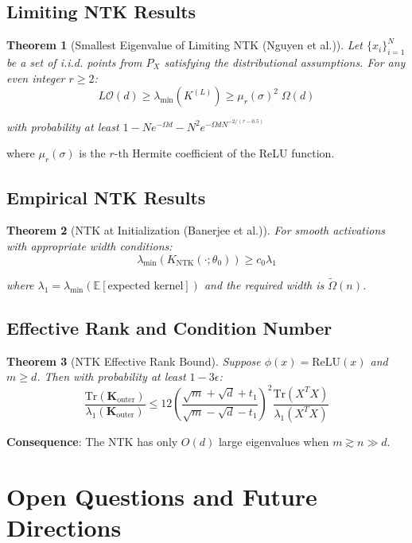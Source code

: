 \documentclass{article}
\newtheorem{theorem}{Theorem}[section]
\newcommand{\E}{\mathbb{E}}
\newcommand{\evmin}[1]{\lambda_{\min}\left(#1\right)}
\newcommand{\bigOmg}{\Omega}
\newcommand{\KNTK}{K_{\text{NTK}}}
\newcommand{\lambdaMin}{\lambda_{\min}}
\newcommand{\Order}{\mathcal{O}}
\newcommand{\TildeOmega}{\tilde{\Omega}}
\begin{document}
\subsection{Limiting NTK Results}

\begin{theorem}[Smallest Eigenvalue of Limiting NTK (Nguyen et al.)]
Let $\{x_i\}_{i=1}^{N}$ be a set of i.i.d. points from $P_X$ satisfying the distributional assumptions. For any even integer $r\ge 2$:
$$L\Order(d) \geq \evmin{K^{(L)}} \geq \mu_r(\sigma)^2\; \bigOmg(d)$$

with probability at least $1 - Ne^{-\bigOmg{d}} - N^2e^{-\bigOmg{dN^{-2/(r-0.5)}}}$
\end{theorem}

where $\mu_r(\sigma)$ is the $r$-th Hermite coefficient of the ReLU function.

\subsection{Empirical NTK Results}

\begin{theorem}[NTK at Initialization (Banerjee et al.)]
For smooth activations with appropriate width conditions:
$$\lambdaMin(\KNTK(\cdot;\theta_0)) \geq c_0 \lambda_1$$

where $\lambda_1 = \lambdaMin(\E[\text{expected kernel}])$ and the required width is $\TildeOmega(n)$.
\end{theorem}

\subsection{Effective Rank and Condition Number}

\begin{theorem}[NTK Effective Rank Bound]
Suppose $\phi(x) = \text{ReLU}(x)$ and $m \geq d$. Then with probability at least $1 - 3\epsilon$:
$$\frac{\text{Tr}(\mathbf{K}_{\text{outer}})}{\lambda_1(\mathbf{K}_{\text{outer}})} \leq 12 \left(\frac{\sqrt{m} + \sqrt{d} + t_1}{\sqrt{m} - \sqrt{d} - t_1}\right)^2 \frac{\text{Tr}(X^T X)}{\lambda_1(X^T X)}$$
\end{theorem}

\textbf{Consequence}: The NTK has only $O(d)$ large eigenvalues when $m \gtrsim n \gg d$.


\newpage



\section{Open Questions and Future Directions}
\end{document}

